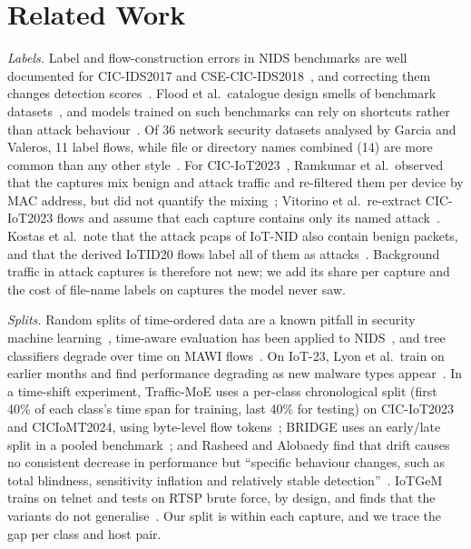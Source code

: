 \section{Related Work}\label{sec:related}

\emph{Labels.} Label and flow-construction errors in NIDS benchmarks are well documented for CIC-IDS2017 and CSE-CIC-IDS2018~\cite{engelen2021troubleshooting,liu2022error}, and correcting them changes detection scores~\cite{lanvin2023errors}. Flood et al.\ catalogue design smells of benchmark datasets~\cite{flood2024smells}, and models trained on such benchmarks can rely on shortcuts rather than attack behaviour~\cite{jacobs2022emperor}. Of 36 network security datasets analysed by Garcia and Valeros, 11 label flows, while file or directory names combined (14) are more common than any other style~\cite{garcia2023labeling}. For CIC-IoT2023~\cite{neto2023ciciot2023}, Ramkumar et al.\ observed that the captures mix benign and attack traffic and re-filtered them per device by MAC address, but did not quantify the mixing~\cite{ramkumar2024diagnosing}; Vitorino et al.\ re-extract CIC-IoT2023 flows and assume that each capture contains only its named attack~\cite{vitorino2025revisiting}. Kostas et al.\ note that the attack pcaps of IoT-NID also contain benign packets, and that the derived IoTID20 flows label all of them as attacks~\cite[App.~A.3]{kostas2024iotgem}. Background traffic in attack captures is therefore not new; we add its share per capture and the cost of file-name labels on captures the model never saw.

\emph{Splits.} Random splits of time-ordered data are a known pitfall in security machine learning~\cite{arp2022dos,pendlebury2019tesseract,apruzzese2023sok}, time-aware evaluation has been applied to NIDS~\cite{andresini2021insomnia}, and tree classifiers degrade over time on MAWI flows~\cite{schraven2026mawiflow}. On IoT-23, Lyon et al.\ train on earlier months and find performance degrading as new malware types appear~\cite{lyon2026iot23drift}. In a time-shift experiment, Traffic-MoE uses a per-class chronological split (first 40\% of each class's time span for training, last 40\% for testing) on CIC-IoT2023 and CICIoMT2024, using byte-level flow tokens~\cite{zhou2026trafficmoe}; BRIDGE uses an early/late split in a pooled benchmark~\cite{bridge2026tchnet}; and Rasheed and Alobaedy find that drift causes no consistent decrease in performance but ``specific behaviour changes, such as total blindness, sensitivity inflation and relatively stable detection''~\cite{rasheed2026drift}. IoTGeM trains on telnet and tests on RTSP brute force, by design, and finds that the variants do not generalise~\cite{kostas2024iotgem}. Our split is within each capture, and we trace the gap per class and host pair.


